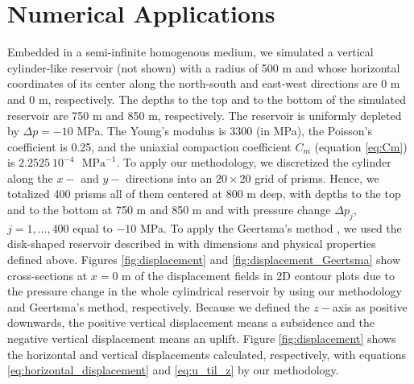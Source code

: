 \documentclass[P]{BrJG_submit}
\begin{document}
\section*{Numerical Applications}


Embedded in a semi-infinite homogenous medium, we simulated a vertical cylinder-like reservoir (not shown) with a radius of 500 m and whose horizontal coordinates of its center along the north-south and east-west directions are 0 m and 0 m, respectively.
The depths to the top and to the bottom of the simulated reservoir are 750 m and 850 m, respectively.
The reservoir is uniformly depleted by $\Delta p = -10$ MPa. 
The Young’s modulus is  3300 (in MPa), the Poisson's coefficient is 0.25, and
the uniaxial compaction coefficient $C_{m}$  (equation \ref{eq:Cm}) is 
$2.2525 \: 10^{-4}$ $\textrm{ MPa}^{-1}$.
To apply our methodology, we  discretized the cylinder  along the $x-$ and $y-$ directions into an $20 \times 20$ grid of prisms. Hence, we totalized 400 prisms all of them centered at 800 m deep, with depths to the top and to the bottom at 750 m and 850 m  and with pressure change $\Delta p_j$, $j = 1, ..., 400$ equal to $-10$ MPa.
To apply the Geertsma’s method \citep{Geertsma73}, we used the disk-shaped reservoir 
described in \cite{Fjaer08} with dimensions and physical properties defined above.
Figures \ref{fig:displacement}  and \ref{fig:displacement_Geertsma}  show cross-sections at 
$x  = 0$ m of the displacement fields in 2D contour plots  due to the pressure change in the whole  cylindrical reservoir by using our methodology and Geertsma’s method, respectively.
Because we defined the $z-$axis as positive downwards, the positive vertical displacement means a subsidence and the negative vertical displacement means an uplift.
Figure \ref{fig:displacement}  shows the horizontal and vertical displacements  calculated, respectively, with equations \ref{eq:horizontal_displacement} and \ref{eq:u_til_z} by our methodology.
\end{document}
